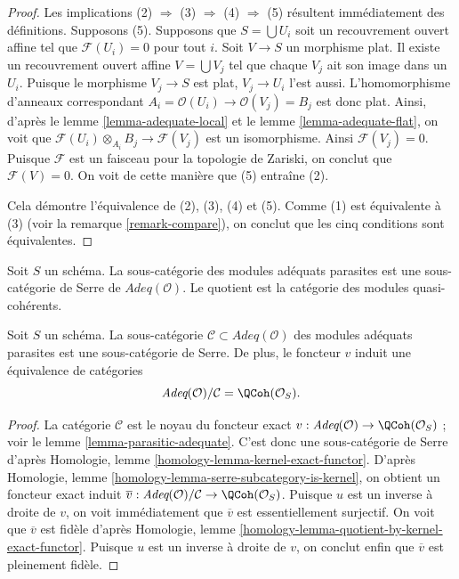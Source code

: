 \begin{proof}
Les implications (2) $\Rightarrow$ (3) $\Rightarrow$ (4) $\Rightarrow$ (5)
résultent immédiatement des définitions. Supposons (5). Supposons que
$S = \bigcup U_i$ soit un recouvrement ouvert affine tel que $\mathcal{F}(U_i) = 0$
pour tout $i$. Soit $V \to S$ un morphisme plat. Il existe un recouvrement ouvert
affine $V = \bigcup V_j$ tel que chaque $V_j$ ait son image dans un
$U_i$. Puisque le morphisme $V_j \to S$ est plat, $V_j \to U_i$ l'est aussi.
L'homomorphisme d'anneaux correspondant
$A_i = \mathcal{O}(U_i) \to \mathcal{O}(V_j) = B_j$ est donc plat. Ainsi, d'après le
lemme \ref{lemma-adequate-local}
et le
lemme \ref{lemma-adequate-flat},
on voit que $\mathcal{F}(U_i) \otimes_{A_i} B_j \to \mathcal{F}(V_j)$
est un isomorphisme. Ainsi $\mathcal{F}(V_j) = 0$. Puisque $\mathcal{F}$ est
un faisceau pour la topologie de Zariski, on conclut que $\mathcal{F}(V) = 0$.
On voit de cette manière que (5) entraîne (2).

\medskip\noindent
Cela démontre l'équivalence de (2), (3), (4) et (5).
Comme (1) est équivalente à (3) (voir la
remarque \ref{remark-compare}),
on conclut que les cinq conditions sont équivalentes.
\end{proof}

\noindent
Soit $S$ un schéma.
La sous-catégorie des modules adéquats parasites est une sous-catégorie de Serre de
$\textit{Adeq}(\mathcal{O})$. Le quotient est la catégorie des
modules quasi-cohérents.

\begin{lemma}
\label{lemma-adequate-by-parasitic}
Soit $S$ un schéma. La sous-catégorie
$\mathcal{C} \subset \textit{Adeq}(\mathcal{O})$ des modules adéquats
parasites est une sous-catégorie de Serre. De plus, le foncteur $v$ induit
une équivalence de catégories
$$
\textit{Adeq}(\mathcal{O}) / \mathcal{C} = \QCoh(\mathcal{O}_S).
$$
\end{lemma}

\begin{proof}
La catégorie $\mathcal{C}$ est le noyau du foncteur exact
$v : \textit{Adeq}(\mathcal{O}) \to \QCoh(\mathcal{O}_S)$ ; voir le
lemme \ref{lemma-parasitic-adequate}.
C'est donc une sous-catégorie de Serre d'après
Homologie, lemme \ref{homology-lemma-kernel-exact-functor}.
D'après
Homologie, lemme \ref{homology-lemma-serre-subcategory-is-kernel},
on obtient un foncteur exact induit
$\overline{v} :
\textit{Adeq}(\mathcal{O}) / \mathcal{C}
\to
\QCoh(\mathcal{O}_S)$.
Puisque $u$ est un inverse à droite de $v$, on voit immédiatement que
$\overline{v}$ est essentiellement surjectif.
On voit que $\overline{v}$ est fidèle d'après
Homologie, lemme \ref{homology-lemma-quotient-by-kernel-exact-functor}.
Puisque $u$ est un inverse à droite de $v$, on conclut enfin que
$\overline{v}$ est pleinement fidèle.
\end{proof}

